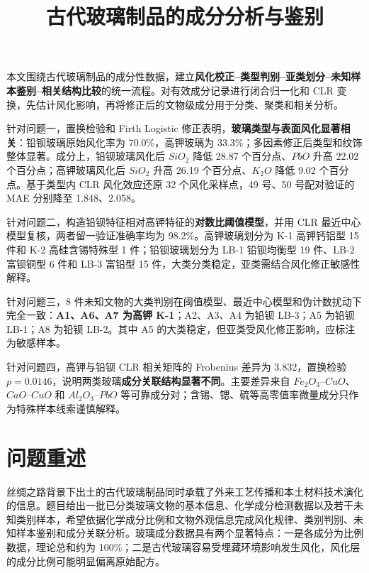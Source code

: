 \documentclass[UTF8,zihao=-4,a4paper,fontset=fandol]{ctexart}
\title{古代玻璃制品的成分分析与鉴别}
\author{}
\date{}
\begin{document}
\maketitle

\begin{cumcmabstract}
本文围绕古代玻璃制品的成分性数据，建立\textbf{风化校正--类型判别--亚类划分--未知样本鉴别--相关结构比较}的统一流程。对有效成分记录进行闭合归一化和 CLR 变换，先估计风化影响，再将修正后的文物级成分用于分类、聚类和相关分析。

针对问题一，置换检验和 Firth Logistic 修正表明，\textbf{玻璃类型与表面风化显著相关}：铅钡玻璃原始风化率为 70.0\%，高钾玻璃为 33.3\%；多因素修正后类型和纹饰整体显著。成分上，铅钡玻璃风化后 $SiO_2$ 降低 28.87 个百分点、$PbO$ 升高 22.02 个百分点；高钾玻璃风化后 $SiO_2$ 升高 26.19 个百分点、$K_2O$ 降低 9.02 个百分点。基于类型内 CLR 风化效应还原 32 个风化采样点，49 号、50 号配对验证的 MAE 分别降至 1.848、2.058。

针对问题二，构造铅钡特征相对高钾特征的\textbf{对数比阈值模型}，并用 CLR 最近中心模型复核，两者留一验证准确率均为 98.2\%。高钾玻璃划分为 K-1 高钾钙铝型 15 件和 K-2 高硅含锡特殊型 1 件；铅钡玻璃划分为 LB-1 铅钡均衡型 19 件、LB-2 富钡铜型 6 件和 LB-3 富铅型 15 件，大类分类稳定，亚类需结合风化修正敏感性解释。

针对问题三，8 件未知文物的大类判别在阈值模型、最近中心模型和伪计数扰动下完全一致：\textbf{A1、A6、A7 为高钾 K-1}；A2、A3、A4 为铅钡 LB-3；A5 为铅钡 LB-1；A8 为铅钡 LB-2。其中 A5 的大类稳定，但亚类受风化修正影响，应标注为敏感样本。

针对问题四，高钾与铅钡 CLR 相关矩阵的 Frobenius 差异为 3.832，置换检验 $p=0.0146$，说明两类玻璃\textbf{成分关联结构显著不同}。主要差异来自 $Fe_2O_3$--$CuO$、$CaO$--$CuO$ 和 $Al_2O_3$--$PbO$ 等可靠成分对；含锡、锶、硫等高零值率微量成分只作为特殊样本线索谨慎解释。
\end{cumcmabstract}


\CumcmBodyStart

\section{问题重述}

丝绸之路背景下出土的古代玻璃制品同时承载了外来工艺传播和本土材料技术演化的信息。题目给出一批已分类玻璃文物的基本信息、化学成分检测数据以及若干未知类别样本，希望依据化学成分比例和文物外观信息完成风化规律、类别判别、未知样本鉴别和成分关联分析。玻璃成分数据具有两个显著特点：一是各成分为比例数据，理论总和约为 100\%；二是古代玻璃容易受埋藏环境影响发生风化，风化层的成分比例可能明显偏离原始配方。
\end{document}
